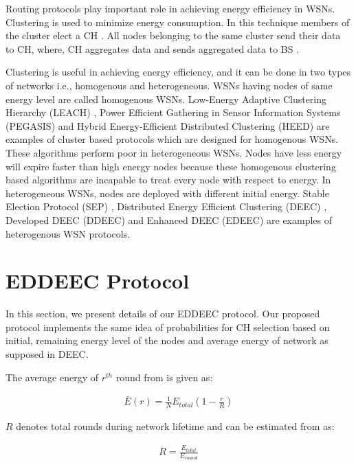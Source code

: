 \documentclass[3p,times,procedia]{elsarticle}
\begin{document}
Routing protocols play important role in achieving energy efficiency in WSNs. Clustering is used to minimize energy consumption. In this technique members of the cluster elect a CH \cite{Reference 2,Reference 3}. All nodes belonging to the same cluster send their data to CH, where, CH aggregates data and sends aggregated data to BS \cite{Reference 4,Reference 5,Reference 6}.

Clustering is useful in achieving energy efficiency, and it can be done in two types of networks i.e., homogenous and heterogeneous. WSNs having nodes of same energy level are called homogenous WSNs. Low-Energy Adaptive Clustering Hierarchy (LEACH) \cite{Reference 5}, Power Efficient Gathering in Sensor Information Systems (PEGASIS) \cite{Reference 7} and Hybrid Energy-Efficient Distributed Clustering (HEED) \cite{Reference 8} are examples of cluster based protocols which are designed for homogenous WSNs. These algorithms perform poor in heterogeneous WSNs. Nodes have less energy will expire faster than high energy nodes because these homogenous clustering based algorithms are incapable to treat every node with respect to energy. In heterogeneous WSNs, nodes are deployed with different initial energy. Stable Election Protocol (SEP) \cite{Reference 9}, Distributed Energy Efficient Clustering (DEEC) \cite{Reference 10}, Developed DEEC (DDEEC) \cite{Reference 11} and Enhanced DEEC (EDEEC) \cite{Reference 12} are examples of heterogenous WSN protocols.

\section{EDDEEC Protocol}
In this section, we present details of our EDDEEC protocol. Our proposed protocol implements the same idea of probabilities for CH selection based on initial, remaining energy level of the nodes and average energy of network as supposed in DEEC.

The average energy of $r^{th}$ round from \cite{Reference 10} is given as:

\begin{eqnarray}
\bar{E}(r)= \frac{1}{N}E_{total}(1-\frac{r}{R})
\end{eqnarray}

$R$ denotes total rounds during network lifetime and can be estimated from \cite{Reference 10} as:

\begin{eqnarray}
R= \frac{E_{total}}{E_{round}}
\end{eqnarray}
\end{document}
